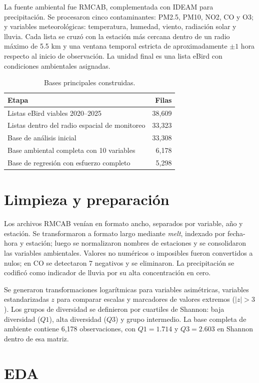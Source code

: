 \documentclass[9pt,letterpaper]{article}
\begin{document}
La fuente ambiental fue RMCAB, complementada con IDEAM para precipitación. Se procesaron cinco contaminantes: PM2.5, PM10, NO2, CO y O3; y variables meteorológicas: temperatura, humedad, viento, radiación solar y lluvia. Cada lista se cruzó con la estación más cercana dentro de un radio máximo de 5.5 km y una ventana temporal estricta de aproximadamente $\pm 1$ hora respecto al inicio de observación. La unidad final es una lista eBird con condiciones ambientales asignadas.

\begin{table}[H]
\centering
\caption{Bases principales construidas.}
\footnotesize
\begin{tabular}{lr}
\toprule
Etapa & Filas \\
\midrule
Listas eBird viables 2020--2025 & 38,609 \\
Listas dentro del radio espacial de monitoreo & 33,323 \\
Base de análisis inicial & 33,308 \\
Base ambiental completa con 10 variables & 6,178 \\
Base de regresión con esfuerzo completo & 5,298 \\
\bottomrule
\end{tabular}
\end{table}

\section{Limpieza y preparación}

Los archivos RMCAB venían en formato ancho, separados por variable, año y estación. Se transformaron a formato largo mediante \textit{melt}, indexado por fecha-hora y estación; luego se normalizaron nombres de estaciones y se consolidaron las variables ambientales. Valores no numéricos o imposibles fueron convertidos a nulos; en CO se detectaron 7 negativos y se eliminaron. La precipitación se codificó como indicador de lluvia por su alta concentración en cero.

Se generaron transformaciones logarítmicas para variables asimétricas, variables estandarizadas $z$ para comparar escalas y marcadores de valores extremos ($|z|>3$). Los grupos de diversidad se definieron por cuartiles de Shannon: baja diversidad ($Q1$), alta diversidad ($Q3$) y grupo intermedio. La base completa de ambiente contiene 6,178 observaciones, con $Q1=1.714$ y $Q3=2.603$ en Shannon dentro de esa matriz.

\section{EDA}
\end{document}
